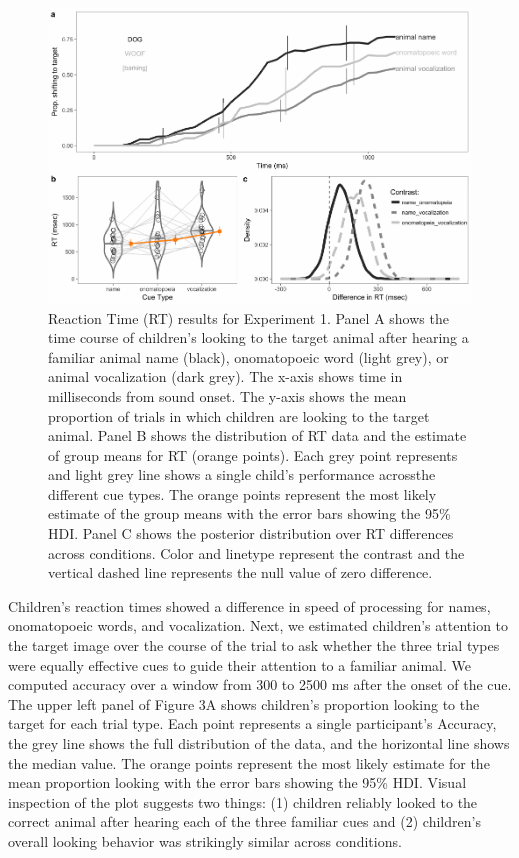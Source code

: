 \documentclass[english,floatsintext,man]{apa6}
\theoremstyle{definition}
\theoremstyle{definition}
\theoremstyle{definition}
\theoremstyle{remark}
\begin{document}
\begin{figure}[H]
\includegraphics[width=0.95\linewidth]{anime_manuscript_files/figure-latex/oc-plot-e1-1} \caption{Reaction Time (RT) results for Experiment 1. Panel A shows the time course of children’s looking to the target animal after hearing a familiar animal name (black), onomatopoeic word (light grey), or animal vocalization (dark grey). The x-axis shows time in milliseconds from sound onset. The y-axis shows the mean proportion of trials in which children are looking to the target animal. Panel B shows the distribution of RT data and the estimate of group means for RT (orange points). Each grey point represents and light grey line shows a single child's performance acrossthe different cue types. The orange points represent the most likely estimate of the group means with the error bars showing the 95\% HDI. Panel C shows the posterior distribution over RT differences across conditions. Color and linetype represent the contrast and the vertical dashed line represents the null value of zero difference.}\label{fig:oc-plot-e1}
\end{figure}

Children's reaction times showed a difference in speed of processing for
names, onomatopoeic words, and vocalization. Next, we estimated
children's attention to the target image over the course of the trial to
ask whether the three trial types were equally effective cues to guide
their attention to a familiar animal. We computed accuracy over a window
from 300 to 2500 ms after the onset of the cue. The upper left panel of
Figure 3A shows children's proportion looking to the target for each
trial type. Each point represents a single participant's Accuracy, the
grey line shows the full distribution of the data, and the horizontal
line shows the median value. The orange points represent the most likely
estimate for the mean proportion looking with the error bars showing the
95\% HDI. Visual inspection of the plot suggests two things: (1)
children reliably looked to the correct animal after hearing each of the
three familiar cues and (2) children's overall looking behavior was
strikingly similar across conditions.
\end{document}
